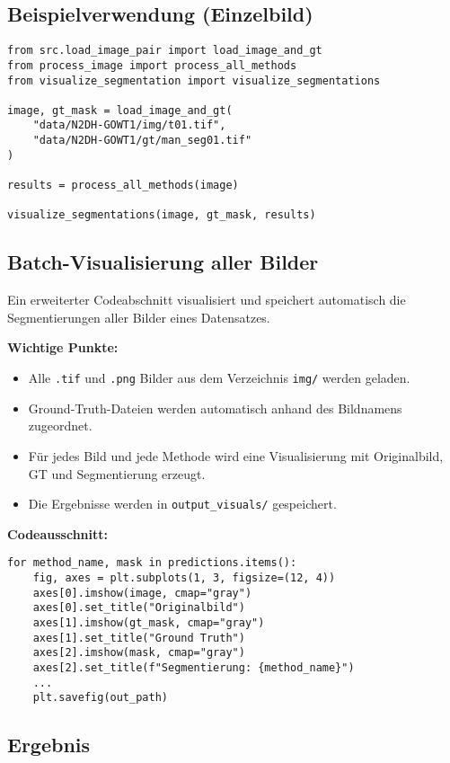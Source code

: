 \documentclass[a4paper,12pt]{article}
\begin{document}
\subsection*{ Beispielverwendung (Einzelbild)}

\begin{verbatim}
from src.load_image_pair import load_image_and_gt
from process_image import process_all_methods
from visualize_segmentation import visualize_segmentations

image, gt_mask = load_image_and_gt(
    "data/N2DH-GOWT1/img/t01.tif",
    "data/N2DH-GOWT1/gt/man_seg01.tif"
)

results = process_all_methods(image)

visualize_segmentations(image, gt_mask, results)
\end{verbatim}

\subsection*{ Batch-Visualisierung aller Bilder}

Ein erweiterter Codeabschnitt visualisiert und speichert automatisch die Segmentierungen aller Bilder eines Datensatzes.

\textbf{Wichtige Punkte:}
\begin{itemize}
  \item Alle \texttt{.tif} und \texttt{.png} Bilder aus dem Verzeichnis \texttt{img/} werden geladen.
  \item Ground-Truth-Dateien werden automatisch anhand des Bildnamens zugeordnet.
  \item Für jedes Bild und jede Methode wird eine Visualisierung mit Originalbild, GT und Segmentierung erzeugt.
  \item Die Ergebnisse werden in \texttt{output\_visuals/} gespeichert.
\end{itemize}

\textbf{Codeausschnitt:}
\begin{verbatim}
for method_name, mask in predictions.items():
    fig, axes = plt.subplots(1, 3, figsize=(12, 4))
    axes[0].imshow(image, cmap="gray")
    axes[0].set_title("Originalbild")
    axes[1].imshow(gt_mask, cmap="gray")
    axes[1].set_title("Ground Truth")
    axes[2].imshow(mask, cmap="gray")
    axes[2].set_title(f"Segmentierung: {method_name}")
    ...
    plt.savefig(out_path)
\end{verbatim}

\subsection*{ Ergebnis}
\end{document}
